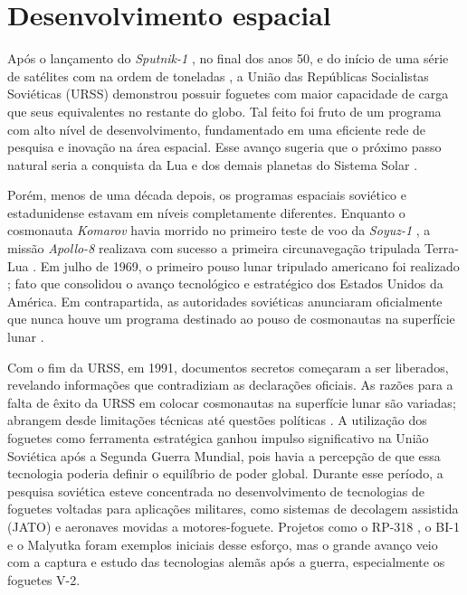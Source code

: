 \section{Desenvolvimento espacial}

Após o lançamento do \emph{Sputnik-1} \cite{nasa1957}, no final dos anos 50, e do início de uma série de satélites com na ordem de toneladas \cite{sputnik3}, a União das Repúblicas Socialistas Soviéticas (URSS) demonstrou possuir foguetes com maior capacidade de carga que seus equivalentes no restante do globo.
Tal feito foi fruto de um programa com alto nível de desenvolvimento, fundamentado em uma eficiente rede de pesquisa e inovação na área espacial. Esse avanço sugeria que o próximo passo natural seria a conquista da Lua e dos demais planetas do Sistema Solar \cite{betzler2024}.

Porém, menos de uma década depois, os programas espaciais soviético e estadunidense estavam em níveis completamente diferentes.
Enquanto o cosmonauta \emph{Komarov} havia morrido no primeiro teste de voo da \emph{Soyuz-1} \cite{zak2018}, a missão \emph{Apollo-8} realizava com sucesso a primeira circunavegação tripulada Terra-Lua \cite{nasaApollo8}.
Em julho de 1969, o primeiro pouso lunar tripulado americano foi realizado \cite{nasaApollo11}; fato que consolidou o avanço tecnológico e estratégico dos Estados Unidos da América.
Em contrapartida, as autoridades soviéticas anunciaram oficialmente que nunca houve um programa destinado ao pouso de cosmonautas na superfície lunar \cite{betzler2024}.

Com o fim da URSS, em 1991, documentos secretos começaram a ser liberados, revelando informações que contradiziam as declarações oficiais.
As razões para a falta de êxito da URSS em colocar cosmonautas na superfície lunar são variadas; abrangem desde limitações técnicas até questões políticas \cite{betzler2024}.
A utilização dos foguetes como ferramenta estratégica ganhou impulso significativo na União Soviética após a Segunda Guerra Mundial, pois havia a percepção de que essa tecnologia poderia definir o equilíbrio de poder global. 
Durante esse período, a pesquisa soviética esteve concentrada no desenvolvimento de tecnologias de foguetes voltadas para aplicações militares, como sistemas de decolagem assistida (JATO) \cite{glushko1973} e aeronaves movidas a motores-foguete.
Projetos como o RP-318 \cite{RP318}, o BI-1 \cite{BI1} e o Malyutka \cite{Malyutka} foram exemplos iniciais desse esforço, mas o grande avanço veio com a captura e estudo das tecnologias alemãs após a guerra, especialmente os foguetes V-2.

